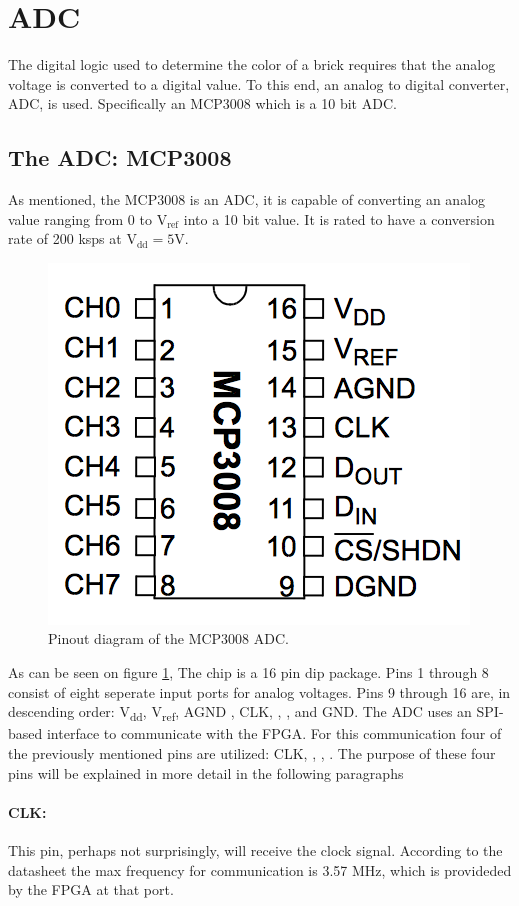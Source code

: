 \section{ADC}
The digital logic used to determine the color of a brick requires that the analog voltage is converted to a digital value. To this end, an analog to digital converter, ADC, is used. Specifically an MCP3008 \cite{mcp3008} which is a 10 bit ADC.
\subsection{The ADC: MCP3008}
As mentioned, the MCP3008 is an ADC, it is capable of converting an analog value ranging from 0 to V$_{\text{ref}}$ into a 10 bit value. It is rated to have a conversion rate of 200 ksps at V$_{\text{dd}} = 5$V. 

\begin{figure}[h!]
	\centering
	\includegraphics[scale = 0.5]{images/MPC3008.png}
	\caption{Pinout diagram of the MCP3008 ADC.}
	\label{fig:pinout}
\end{figure}
As can be seen on figure \ref{fig:pinout}, The chip is a 16 pin dip package. Pins 1 through 8 consist of eight seperate input ports for analog voltages. Pins 9 through 16 are, in descending order: V\textsubscript{dd}, V\textsubscript{ref}, AGND , CLK, \dout,  \din, \cs and GND. 
The ADC uses an SPI-based interface to communicate with the FPGA. For this communication four of the previously mentioned pins are utilized: CLK, \cs, \dout, \din. The purpose of these four pins will be explained in more detail in the following paragraphs


\paragraph{CLK:}
This pin, perhaps not surprisingly, will receive the clock signal. According to the datasheet the max frequency for communication is 3.57 MHz, which is provideded by the FPGA at that port.

